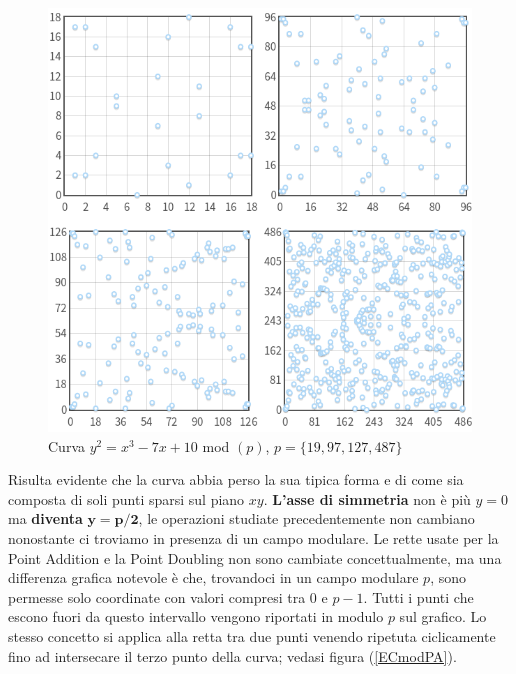 \documentclass[a4paper,12pt]{tesiinfo}
\begin{document}
\begin{figure}[H]
 \includegraphics[width=.8\textwidth,center]{ECmod(p)}
 \caption{Curva $y^2 = x^3-7x+10$ mod $(p)$, $p = \{19, 97, 127, 487\}$}
\end{figure}
Risulta evidente che la curva abbia perso la sua tipica forma e di come sia composta di soli punti sparsi sul piano $xy$. 
\textbf{L'asse di simmetria} non \`e pi\`u $y=0$ ma \textbf{diventa} $\mathbold{y=p\big / 2}$, le operazioni studiate precedentemente non cambiano nonostante ci troviamo in presenza di un campo modulare. Le rette usate per la Point Addition e la Point Doubling non sono cambiate concettualmente, ma una differenza grafica notevole \`e che, trovandoci in un campo modulare $p$, sono permesse solo coordinate con valori compresi tra $0$ e $p-1$. Tutti i punti che escono fuori da questo intervallo vengono riportati in modulo $p$ sul grafico. Lo stesso concetto si applica alla retta tra due punti venendo ripetuta ciclicamente fino ad intersecare il terzo punto della curva; vedasi figura (\ref{ECmodPA}).
\end{document}
